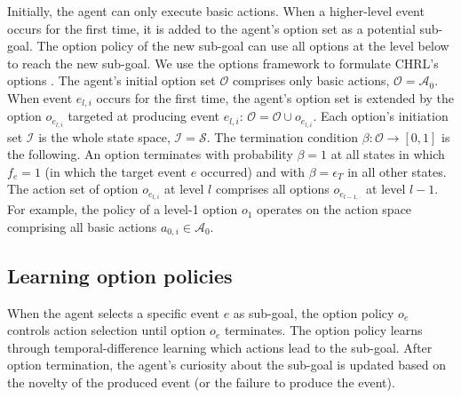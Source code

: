 \documentclass{article}
\begin{document}
Initially, the agent can only execute basic actions. When a higher-level event occurs for the first time, it is added to the agent's option set as a potential sub-goal. The option policy of the new sub-goal can use all options at the level below to reach the new sub-goal. We use the options framework to formulate CHRL's options \cite{sutton_between_1999}. The agent's initial option set $\mathcal{O}$ comprises only basic actions, $\mathcal{O} = \mathcal{A}_0$. When event $e_{l, i}$ occurs for the first time, the agent's option set is extended by the option $o_{e_{l, i}}$ targeted at producing event $e_{l, i}$: $\mathcal{O} = \mathcal{O} \cup o_{e_{l, i}}$. Each option's initiation set $\mathcal{I}$ is the whole state space, $\mathcal{I} = \mathcal{S}$. The termination condition $\beta: \mathcal{O} \rightarrow [0, 1]$ is the following. An option terminates with probability $\beta=1$ at all states in which $f_e = 1$ (in which the target event $e$ occurred) and with $\beta = \epsilon_T$ in all other states. The action set of option $o_{e_{l, i}}$ at level $l$ comprises all options $o_{e_{l-1, \cdot}}$ at level $l-1$. For example, the policy of a level-1 option $o_1$ operates on the action space comprising all basic actions $a_{0, i} \in \mathcal{A}_0$. 

\subsection{Learning option policies}

When the agent selects a specific event $e$ as sub-goal, the option policy $o_e$ controls action selection until option $o_e$ terminates. The option policy learns through temporal-difference learning \cite{sutton_reinforcement_2017} which actions lead to the sub-goal. After option termination, the agent's curiosity about the sub-goal is updated based on the novelty of the produced event (or the failure to produce the event).

\end{document}
